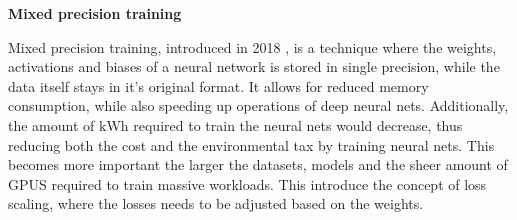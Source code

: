 \textbf{Mixed precision training}

Mixed precision training, introduced in 2018 \cite{micikevicius2018mixed}, is a technique where the weights, activations and biases of a neural network is stored in single precision, while the data itself stays in it's original format. It allows for reduced memory consumption, while also speeding up operations of deep neural nets. Additionally, the amount of $\si{\kilo\watt\hour}$ required to train the neural nets would decrease, thus reducing both the cost and the environmental tax by training neural nets. This becomes more important the larger the datasets, models and the sheer amount of GPUS required to train massive workloads. This introduce the concept of loss scaling, where the losses needs to be adjusted based on the weights. \\

